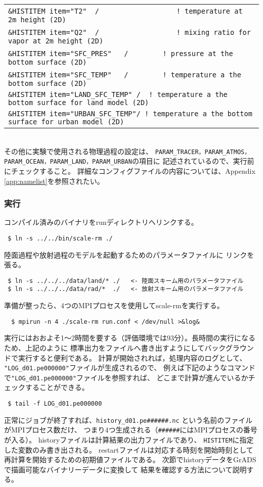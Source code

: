 {{{\begin{tabularx}{150mm}{l}
\verb|&HISTITEM item="T2"  / 　     　  　    　! temperature at 2m height (2D)| \\
\verb|&HISTITEM item="Q2"  / 　     　  　    　! mixing ratio for vapor at 2m height (2D)| \\
\verb|&HISTITEM item="SFC_PRES"   / 　    　! pressure at the bottom surface (2D)| \\
\verb|&HISTITEM item="SFC_TEMP"   / 　    　! temperature a the bottom surface (2D)| \\
\verb|&HISTITEM item="LAND_SFC_TEMP" /  ! temperature a the bottom surface for land model (2D)| \\
\verb|&HISTITEM item="URBAN_SFC_TEMP"/ ! temperature a the bottom surface for urban model (2D)| \\
\end{tabularx}
}}}\\

\noindent その他に実験で使用される物理過程の設定は、
\verb|PARAM_TRACER，PARAM_ATMOS，PARAM_OCEAN，PARAM_LAND，PARAM_URBAN|の項目に
記述されているので、実行前にチェックすること。
詳細なコンフィグファイルの内容については、Appendix \ref{app:namelist}を参照されたい。

%
\subsubsection{実行}
コンパイル済みのバイナリをrunディレクトリへリンクする。

\begin{verbatim}
 $ ln -s ../../bin/scale-rm ./
\end{verbatim}
陸面過程や放射過程のモデルを起動するためのパラメータファイルに
リンクを張る。
\begin{verbatim}
 $ ln -s ../../../data/land/* ./   <- 陸面スキーム用のパラメータファイル
 $ ln -s ../../../data/rad/*  ./   <- 放射スキーム用のパラメータファイル
\end{verbatim}
準備が整ったら、4つのMPIプロセスを使用してscale-rmを実行する。
\begin{verbatim}
  $ mpirun -n 4 ./scale-rm run.conf < /dev/null >&log&
\end{verbatim}

実行にはおおよそ1〜2時間を要する（評価環境では93分）。長時間の実行になるため、上記のように
標準出力をファイルへ書き出すようにしてバックグラウンドで実行すると便利である。
計算が開始されれば，処理内容のログとして、
\verb|"LOG_d01.pe000000"|ファイルが生成されるので、
例えば下記のようなコマンドで\verb|"LOG_d01.pe000000"|ファイルを参照すれば、
どこまで計算が進んでいるかチェックすることができる。
\begin{verbatim}
 $ tail -f LOG_d01.pe000000
\end{verbatim}
正常にジョブが終了すれば、\verb|history_d01.pe######.nc|
という名前のファイルがMPIプロセス数だけ、
つまり4つ生成される（\verb|######|にはMPIプロセスの番号が入る）。
historyファイルは計算結果の出力ファイルであり、
\verb|HISTITEM|に指定した変数のみ書き出される。
restartファイルは対応する時刻を開始時刻として
再計算を開始するための初期値ファイルである。
次節でhistoryデータをGrADSで描画可能なバイナリーデータに変換して
結果を確認する方法について説明する。



